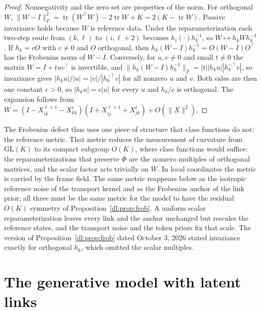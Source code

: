 \documentclass[11pt]{article}
\theoremstyle{definition}
\theoremstyle{remark}
\providecommand{\GL}{\mathrm{GL}}
\providecommand{\tr}{\operatorname{tr}}
\begin{document}
\begin{proof}
Nonnegativity and the zero set are properties of the norm. For orthogonal $W$, $\|W-I\|_F^2=\tr(W^\top W)-2\tr W+K=2(K-\tr W)$. Passive invariance holds because $W$ is reference data. Under the reparameterization each two-step route from $(k,\ell)$ to $(i,\ell+2)$ becomes $h_i(\cdot)h_k^{-1}$, so $W\mapsto h_kWh_k^{-1}$. If $h_k=cO$ with $c\ne0$ and $O$ orthogonal, then $h_k(W-I)h_k^{-1}=O(W-I)O^\top$ has the Frobenius norm of $W-I$. Conversely, for $u,v\ne0$ and small $t\ne0$ the matrix $W=I+tuv^\top$ is invertible, and $\|h_k(W-I)h_k^{-1}\|_F=|t||h_ku||h_k^{-\top}v|$, so invariance gives $|h_ku|/|u|=|v|/|h_k^{-\top}v|$ for all nonzero $u$ and $v$. Both sides are then one constant $c>0$, so $|h_ku|=c|u|$ for every $u$ and $h_k/c$ is orthogonal. The expansion follows from $W=(I-X_{ik}^{\ell+1}-X_{kk}^\ell)(I+X_{ij}^{\ell+1}+X_{jk}^\ell)+O(\|X\|^2)$.
\end{proof}

The Frobenius defect thus uses one piece of structure that class functions do not: the reference metric. That metric reduces the measurement of curvature from $\GL(K)$ to its compact subgroup $O(K)$, where class functions would suffice: the reparameterizations that preserve $\Phi$ are the nonzero multiples of orthogonal matrices, and the scalar factor acts trivially on $W$. In local coordinates the metric is carried by the frame field. The same metric reappears below as the isotropic reference noise of the transport kernel and as the Frobenius anchor of the link prior; all three must be the same metric for the model to have the residual $O(K)$ symmetry of Proposition~\ref{dl:prop:frob}. A uniform scalar reparameterization leaves every link and the anchor unchanged but rescales the reference states, and the transport noise and the token priors fix that scale. The version of Proposition~\ref{dl:prop:frob} dated October 3, 2026 stated invariance exactly for orthogonal $h_k$, which omitted the scalar multiples.

\section{The generative model with latent links}
\label{dl:sec:model}
\end{document}
